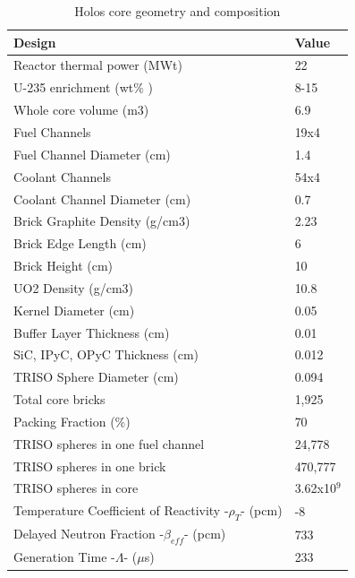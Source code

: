 \begin{table} [htbp]
\begin{center}

\caption{Holos core geometry and composition}
\label{Holostable}
\begin{tabular}{l     l}
\hline 
Design 		&Value \\ 
\hline 
Reactor thermal power (MWt)&22                                             \\
U-235 enrichment (wt\% )&8-15             \\
Whole core volume (m3)&6.9                                        \\
\hline 
Fuel Channels&19x4                      \\
Fuel Channel Diameter (cm)&1.4            \\
Coolant Channels&54x4                   \\
Coolant Channel Diameter (cm)&0.7               \\
Brick Graphite Density (g/cm3)&2.23              \\
Brick Edge Length (cm)&6               \\
Brick Height (cm)&10             \\
\hline 
UO2 Density  (g/cm3) & 10.8                       \\
Kernel Diameter  (cm) & 0.05                       \\
Buffer Layer Thickness  (cm) & 0.01            \\
SiC, IPyC, OPyC Thickness  (cm) & 0.012   \\
TRISO Sphere Diameter  (cm) & 0.094         \\
Total core bricks & 1,925                           \\
Packing Fraction (\%) & 70                       \\
\hline 
TRISO spheres in one fuel channel  &24,778   \\
TRISO spheres in one brick            &470,777 \\
TRISO spheres in core  &3.62x10$^{9}$            \\
\hline 
Temperature Coefficient of Reactivity -$\rho_{T}$- (pcm)&-8       \\
Delayed Neutron Fraction -$\beta_{eff}$- (pcm)&733      \\
Generation Time -$\Lambda$- ($\mu$s)&233                        \\
\hline 

\end{tabular}
\end{center}
\end{table}


